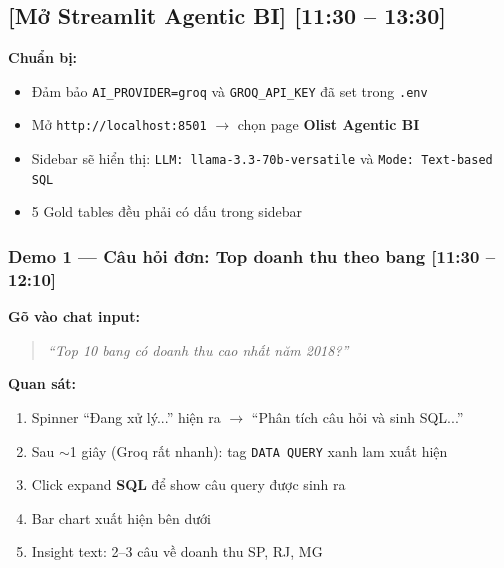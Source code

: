 \documentclass[12pt, a4paper]{article}
\newenvironment{speakerbox}[2]{%
  \begin{tcolorbox}[
    enhanced, breakable,
    colback=#1!6!white, colframe=#1,
    colbacktitle=#1, coltitle=white,
    fonttitle=\bfseries\large,
    title={#2}, arc=4pt, boxrule=1.5pt,
    left=8pt, right=8pt, top=6pt, bottom=6pt,
  ]
}{\end{tcolorbox}}
\newcommand{\timing}[1]{%
  \hfill{\small\bfseries\color{gray}[#1]}%
}
\begin{document}
\begin{speakerbox}{p4color}{\faUser\ Người 4 · Phần Agentic BI (khoảng 2 phút)}

\subsection*{[Mở Streamlit Agentic BI] \timing{11:30 -- 13:30}}

\begin{demobox}
\textbf{Chuẩn bị:}
\begin{itemize}[leftmargin=1.5em, itemsep=2pt]
  \item Đảm bảo \texttt{AI\_PROVIDER=groq} và \texttt{GROQ\_API\_KEY} đã set trong \texttt{.env}
  \item Mở \texttt{http://localhost:8501} $\to$ chọn page \textbf{Olist Agentic BI}
  \item Sidebar sẽ hiển thị: \texttt{LLM: llama-3.3-70b-versatile} và \texttt{Mode: Text-based SQL}
  \item 5 Gold tables đều phải có dấu \textcolor{green!60!black}{\faCheckCircle} trong sidebar
\end{itemize}
\end{demobox}

\vspace{0.5em}

\subsubsection*{Demo 1 — Câu hỏi đơn: Top doanh thu theo bang \timing{11:30 -- 12:10}}

\begin{demobox}
\textbf{Gõ vào chat input:}
\begin{quote}
\textit{``Top 10 bang có doanh thu cao nhất năm 2018?''}
\end{quote}
\textbf{Quan sát:}
\begin{enumerate}[leftmargin=1.5em, itemsep=2pt]
  \item Spinner ``Đang xử lý...'' hiện ra $\to$ ``Phân tích câu hỏi và sinh SQL...''
  \item Sau $\sim$1 giây (Groq rất nhanh): tag \texttt{DATA QUERY} xanh lam xuất hiện
  \item Click expand \textbf{SQL} để show câu query được sinh ra
  \item Bar chart xuất hiện bên dưới
  \item Insight text: 2--3 câu về doanh thu SP, RJ, MG
\end{enumerate}
\end{demobox}


\end{speakerbox}
\end{document}
